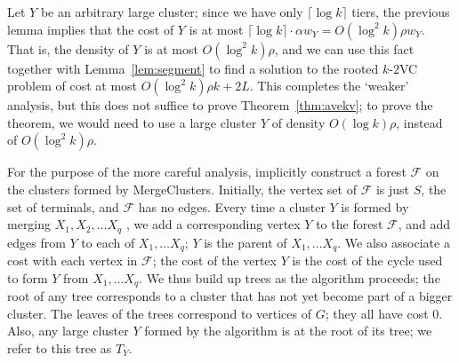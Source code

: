 \documentclass[11pt]{article}
\newcommand{\kvc}[1]{$k$-$#1${\sc VC} }
\newcommand{\kv}{\kvc{2}}
\newcommand{\ceil}[1]{\lceil #1 \rceil}
\newcommand{\script}[1]{\mathcal{#1}}
\begin{document}
\bigskip
Let $Y$ be an arbitrary large cluster; since we have only $\ceil{\log k}$
tiers, the previous lemma implies that the cost of $Y$ is at most
$\ceil{\log k} \cdot \alpha w_Y = O(\log^2 k) \rho w_Y$. That is, the
density of $Y$ is at most $O(\log^2 k) \rho$, and we can use this fact
together with Lemma~\ref{lem:segment} to find a solution to the rooted \kv
problem of cost at most $O(\log^2 k) \rho k + 2L$. This completes the
`weaker' analysis, but this does not suffice to prove
Theorem~\ref{thm:avekv}; to prove the theorem, we would need to use a large
cluster $Y$ of density $O(\log k) \rho$, instead of $O(\log^2 k) \rho$.

For the purpose of the more careful analysis, implicitly construct a
forest $\script{F}$ on the clusters formed by {\sc
  MergeClusters}. Initially, the vertex set of $\script{F}$ is just
$S$, the set of terminals, and $\script{F}$ has no edges. Every time a
cluster $Y$ is formed by merging $X_1, X_2, \ldots X_q$ , we add a
corresponding vertex $Y$ to the forest $\script{F}$, and add edges
from $Y$ to each of $X_1, \ldots X_q$; $Y$ is the parent of $X_1,
\ldots X_q$. We also associate a cost with each vertex in
$\script{F}$; the cost of the vertex $Y$ is the cost of the cycle used
to form $Y$ from $X_1, \ldots X_q$. We thus build up trees as the
algorithm proceeds; the root of any tree corresponds to a cluster that
has not yet become part of a bigger cluster. The leaves of the trees
correspond to vertices of $G$; they all have cost 0. Also, any large
cluster $Y$ formed by the algorithm is at the root of its tree; we
refer to this tree as $T_Y$.
\end{document}
